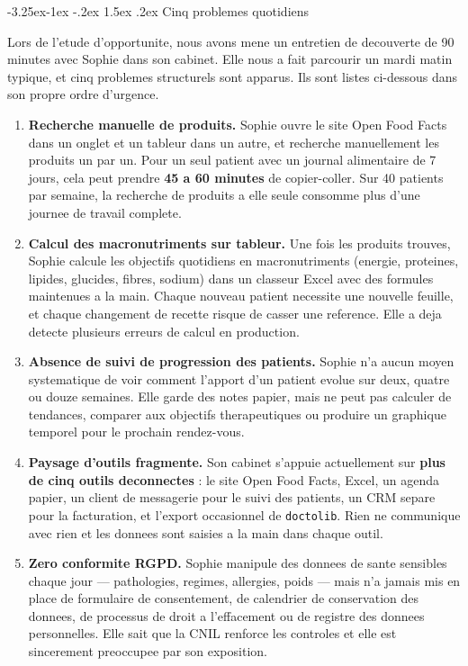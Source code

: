\documentclass[a4paper,11pt,oneside,openany]{report}
\makeatletter
\renewcommand\subsection{\@startsection{subsection}{2}{\z@}%
  {-3.25ex\@plus -1ex \@minus -.2ex}%
  {1.5ex \@plus .2ex}%
  {\normalfont\large\bfseries\color{ntdarkgreen}}}
\newcommand{\off}{Open Food Facts}
\newcommand{\rgpd}{RGPD}
\makeatother
\begin{document}
\subsection{Cinq problemes quotidiens}

Lors de l'etude d'opportunite, nous avons mene un entretien de
decouverte de 90 minutes avec Sophie dans son cabinet. Elle nous a
fait parcourir un mardi matin typique, et cinq problemes structurels
sont apparus. Ils sont listes ci-dessous dans son propre ordre
d'urgence.

\begin{enumerate}[nosep]
  \item \textbf{Recherche manuelle de produits.} Sophie ouvre le
        site \off{} dans un onglet et un tableur dans un autre, et
        recherche manuellement les produits un par un. Pour un seul
        patient avec un journal alimentaire de 7 jours, cela peut
        prendre \textbf{45 a 60 minutes} de copier-coller. Sur
        40 patients par semaine, la recherche de produits a elle
        seule consomme plus d'une journee de travail complete.
  \item \textbf{Calcul des macronutriments sur tableur.} Une fois les
        produits trouves, Sophie calcule les objectifs quotidiens en
        macronutriments (energie, proteines, lipides, glucides, fibres,
        sodium) dans un classeur Excel avec des formules maintenues a
        la main. Chaque nouveau patient necessite une nouvelle feuille,
        et chaque changement de recette risque de casser une reference.
        Elle a deja detecte plusieurs erreurs de calcul en production.
  \item \textbf{Absence de suivi de progression des patients.} Sophie
        n'a aucun moyen systematique de voir comment l'apport d'un
        patient evolue sur deux, quatre ou douze semaines. Elle garde
        des notes papier, mais ne peut pas calculer de tendances,
        comparer aux objectifs therapeutiques ou produire un graphique
        temporel pour le prochain rendez-vous.
  \item \textbf{Paysage d'outils fragmente.} Son cabinet s'appuie
        actuellement sur \textbf{plus de cinq outils deconnectes} : le
        site \off{}, Excel, un agenda papier, un client de messagerie
        pour le suivi des patients, un CRM separe pour la facturation,
        et l'export occasionnel de \texttt{doctolib}. Rien ne communique
        avec rien et les donnees sont saisies a la main dans chaque outil.
  \item \textbf{Zero conformite \rgpd{}.} Sophie manipule des donnees
        de sante sensibles chaque jour --- pathologies, regimes,
        allergies, poids --- mais n'a jamais mis en place de formulaire
        de consentement, de calendrier de conservation des donnees, de
        processus de droit a l'effacement ou de registre des donnees
        personnelles. Elle sait que la CNIL renforce les controles et
        elle est sincerement preoccupee par son exposition.
\end{enumerate}
\end{document}
